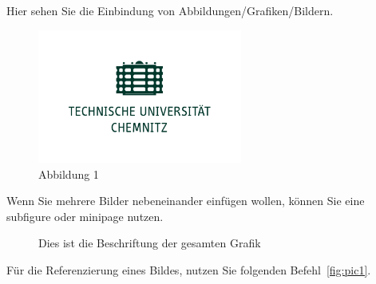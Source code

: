 
Hier sehen Sie die Einbindung von Abbildungen/Grafiken/Bildern.

\begin{figure}[h]
\centering
\includegraphics[width=0.6\textwidth]{TU_Chemnitz_positiv_gruen.pdf}
\caption{Abbildung 1}
\label{fig:pic0}
\end{figure}

Wenn Sie mehrere Bilder nebeneinander einfügen wollen, können Sie eine subfigure oder minipage nutzen.

\begin{figure}[h]
\caption{Dies ist die Beschriftung der gesamten Grafik}
\end{figure}

Für die Referenzierung eines Bildes, nutzen Sie folgenden Befehl~\ref{fig:pic1}.
